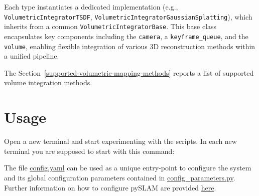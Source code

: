 \documentclass{article}
\newenvironment{Shaded}{\begin{snugshade}}{\end{snugshade}}
\newcommand{\BuiltInTok}[1]{\textcolor[rgb]{0.74,0.68,0.62}{#1}}
\newcommand{\CommentTok}[1]{\textcolor[rgb]{0.00,0.40,1.00}{\textbf{\textit{#1}}}}
\newcommand{\ExtensionTok}[1]{\textcolor[rgb]{0.74,0.68,0.62}{#1}}
\newcommand{\NormalTok}[1]{\textcolor[rgb]{0.74,0.68,0.62}{#1}}
\begin{document}
Each type instantiates a dedicated implementation (e.g., \texttt{VolumetricIntegratorTSDF}, \texttt{VolumetricIntegrator\-Gaussian\-Splatting}), which inherits from a common \texttt{VolumetricIntegratorBase}. This base class encapsulates key components including the \texttt{camera}, a \texttt{keyframe\_queue}, and the \texttt{volume}, enabling flexible integration of various 3D reconstruction methods within a unified pipeline.

The Section~\ref{supported-volumetric-mapping-methods} reports a list of supported volume integration methods.


%

\FloatBarrier

\hypertarget{usage}{%
\section{Usage}\label{usage}}

Open a new terminal and start experimenting with the scripts. In each
new terminal you are supposed to start with this command:

\begin{scriptsize}
\begin{Shaded}
\end{Shaded}
\end{scriptsize}

The file \href{./config.yaml}{config.yaml} can be used as a unique
entry-point to configure the system and its global configuration
parameters contained in
\href{./config_parameters.py}{config\_parameters.py}. Further
information on how to configure pySLAM are provided
\protect\hyperlink{selecting-a-dataset-and-different-configuration-parameters}{here}.
\end{document}
